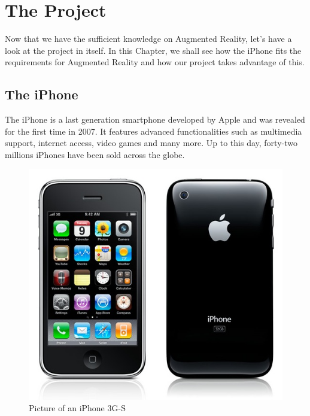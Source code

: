 \chapter{The Project}

Now that we have the sufficient knowledge on Augmented Reality, let's have a look at the project in itself. In this Chapter, we shall see how the iPhone fits the requirements for Augmented Reality and how our project takes advantage of this.

\section{The iPhone}
\label{sec:the_iphone}

The iPhone is a last generation smartphone developed by Apple and was revealed for the first time in 2007. It features advanced functionalities such as multimedia support, internet access, video games and many more. Up to this day, forty-two millions iPhones have been sold across the globe.\\

\begin{figure}[ht]
\center
\includegraphics[scale=0.3]{pics/iphone}
\caption{Picture of an iPhone 3G-S \cite{iphoneimagesource}}
\label{fig:client_view_hierarchy}
\end{figure}


